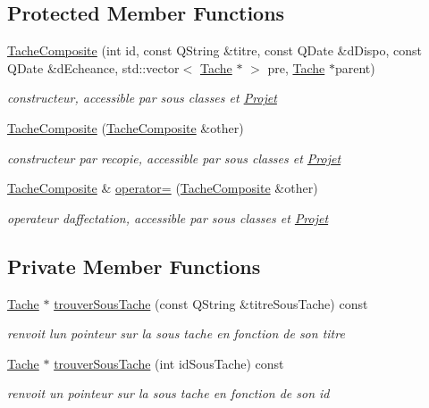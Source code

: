 \subsection*{Protected Member Functions}
\begin{DoxyCompactItemize}
\item 
\hyperlink{class_tache_composite_afb044dffd39c4c4378bcd2ea9cfa4fa7}{Tache\+Composite} (int id, const Q\+String \&titre, const Q\+Date \&d\+Dispo, const Q\+Date \&d\+Echeance, std\+::vector$<$ \hyperlink{class_tache}{Tache} $\ast$ $>$ pre, \hyperlink{class_tache}{Tache} $\ast$parent)
\begin{DoxyCompactList}\small\item\em constructeur, accessible par sous classes et \hyperlink{class_projet}{Projet} \end{DoxyCompactList}\item 
\hyperlink{class_tache_composite_a7dd6c584f8fb36f9671df59c8971709e}{Tache\+Composite} (\hyperlink{class_tache_composite}{Tache\+Composite} \&other)
\begin{DoxyCompactList}\small\item\em constructeur par recopie, accessible par sous classes et \hyperlink{class_projet}{Projet} \end{DoxyCompactList}\item 
\hyperlink{class_tache_composite}{Tache\+Composite} \& \hyperlink{class_tache_composite_a4ddf7c1bfa9ef2e2790d5cef803172c8}{operator=} (\hyperlink{class_tache_composite}{Tache\+Composite} \&other)
\begin{DoxyCompactList}\small\item\em operateur d\textquotesingle{}affectation, accessible par sous classes et \hyperlink{class_projet}{Projet} \end{DoxyCompactList}\end{DoxyCompactItemize}
\subsection*{Private Member Functions}
\begin{DoxyCompactItemize}
\item 
\hyperlink{class_tache}{Tache} $\ast$ \hyperlink{class_tache_composite_a0cb50cd658968c93e255f5f55dddd884}{trouver\+Sous\+Tache} (const Q\+String \&titre\+Sous\+Tache) const 
\begin{DoxyCompactList}\small\item\em renvoit lun pointeur sur la sous tache en fonction de son titre \end{DoxyCompactList}\item 
\hyperlink{class_tache}{Tache} $\ast$ \hyperlink{class_tache_composite_a4257d0b5cdd8a9d54307ea55366bf692}{trouver\+Sous\+Tache} (int id\+Sous\+Tache) const 
\begin{DoxyCompactList}\small\item\em renvoit un pointeur sur la sous tache en fonction de son id \end{DoxyCompactList}\end{DoxyCompactItemize}
